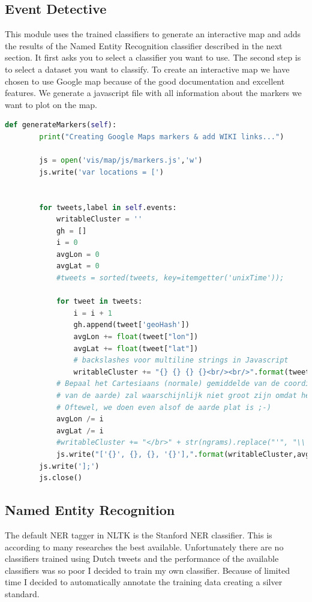 \documentclass[
10pt, %
a4paper, %
oneside, %
headinclude,footinclude, %
BCOR5mm, %
]{scrartcl}
\begin{document}
\subsection{Event Detective}
This module uses the trained classifiers to generate an interactive map and adds the results of the Named Entity Recognition classifier described in the next section. It first asks you to select a classifier you want to use. The second step is to select a dataset you want to classify.
\vl
To create an interactive map we have chosen to use Google map because of the good documentation and excellent features. We generate a javascript file with all information about the markers we want to plot on the map. 
\begin{lstlisting}[language=Python, caption=Generate Javascript file]
def generateMarkers(self):
        print("Creating Google Maps markers & add WIKI links...")
        
        js = open('vis/map/js/markers.js','w')
        js.write('var locations = [')

        
        for tweets,label in self.events:
            writableCluster = ''
            gh = []
            i = 0
            avgLon = 0
            avgLat = 0
            #tweets = sorted(tweets, key=itemgetter('unixTime'));
                              
            for tweet in tweets:
                i = i + 1
                gh.append(tweet['geoHash'])
                avgLon += float(tweet["lon"])
                avgLat += float(tweet["lat"])
                # backslashes voor multiline strings in Javascript
                writableCluster += "{} {} {} {}<br/><br/>".format(tweet['localTime'], tweet['geoHash'], tweet['user'], tweet['text']).replace("'", "\\'")
            # Bepaal het Cartesiaans (normale) gemiddelde van de coordinaten, de afwijking (door vorm
            # van de aarde) zal waarschijnlijk niet groot zijn omdat het gaat om een klein vlak op aarde...
            # Oftewel, we doen even alsof de aarde plat is ;-)
            avgLon /= i
            avgLat /= i
            #writableCluster += "</br>" + str(ngrams).replace("'", "\\'")
            js.write("['{}', {}, {}, '{}'],".format(writableCluster,avgLat,avgLon,label))
        js.write('];')
        js.close()
\end{lstlisting}

\subsection{Named Entity Recognition}
The default NER tagger in NLTK is the Stanford NER classifier. This is according to many researches the best available. Unfortunately there are no classifiers trained using Dutch tweets and the performance of the available classifiers was so poor I decided to train my own classifier. Because of limited time I decided to automatically annotate the training data creating a silver standard.
\end{document}
